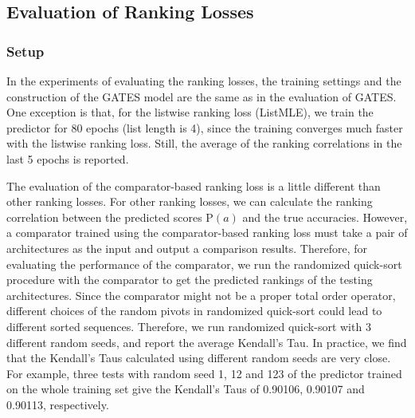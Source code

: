 \documentclass[runningheads]{llncs}
\begin{document}
\subsection{Evaluation of Ranking Losses}
\subsubsection{Setup}


In the experiments of evaluating the ranking losses, the training settings and the construction of the GATES model are the same as in the evaluation of GATES. 
One exception is that, for the listwise ranking loss (ListMLE), we train the predictor for 80 epochs (list length is 4), since the training converges much faster with the listwise ranking loss. Still, the average of the ranking correlations in the last 5 epochs is reported.

The evaluation of the comparator-based ranking loss is a little different than other ranking losses. For other ranking losses, we can calculate the ranking correlation between the predicted scores $\mbox{P}(a)$ and the true accuracies. However, a comparator trained using the comparator-based ranking loss must take a pair of architectures as the input and output a comparison results. Therefore, for evaluating the performance of the comparator,
we run the randomized quick-sort procedure with the comparator to get the predicted rankings of the testing architectures. Since the comparator might not be a proper total order operator, different choices of the random pivots in randomized quick-sort could lead to different sorted sequences. Therefore, we run randomized quick-sort with 3 different random seeds, and report the average Kendall's Tau. In practice, we find that the Kendall's Taus calculated using different random seeds are very close. For example, three tests with random seed 1, 12 and 123 of the predictor trained on the whole training set give the Kendall's Taus of 0.90106, 0.90107 and 0.90113, respectively.
\end{document}
